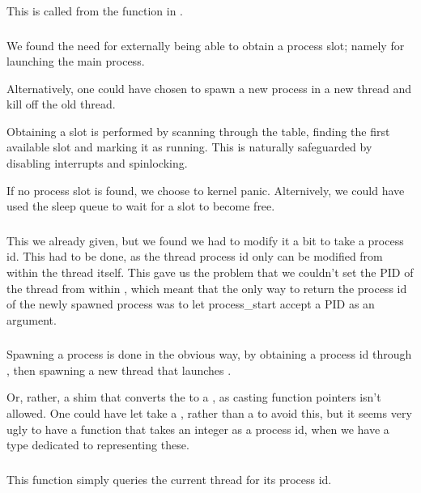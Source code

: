 This is called from the  function in .

\subsubsection{}
We found the need for externally being able to obtain a process slot; namely for
launching the main process.

Alternatively, one could have chosen to spawn a new process in a new thread
and kill off the old thread.

Obtaining a slot is performed by scanning through the table, finding the first
available slot and marking it as running. This is naturally safeguarded by
disabling interrupts and spinlocking.

If no process slot is found, we choose to kernel panic. Alternively, we could have
used the sleep queue to wait for a slot to become free.

\subsubsection{}
This we already given, but we found we had to modify it a bit to take a
process id. This had to be done, as the thread process id only can be modified
from within the thread itself. This gave us the problem that we couldn't set the
PID of the thread from within , which meant that the only
way to return the process id of the newly spawned process was to let process\_start
accept a PID as an argument.

\subsubsection{}
Spawning a process is done in the obvious way, by obtaining a process id
through , then spawning a new thread that launches
.

Or, rather, a shim that converts the  to a ,
as casting function pointers isn't allowed. One could have let 
take a , rather than a  to avoid this, but
it seems very ugly to have a function that takes an integer as a process id, when
we have a type dedicated to representing these.

\subsubsection{}
This function simply queries the current thread for its process id.

